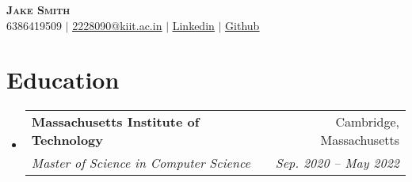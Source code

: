 \documentclass[letterpaper,11pt]{article}
\makeatletter
\newcommand{\resumeSubheading}[4]{
    \vspace{-2pt}\item
      \begin{tabular*}{0.97\textwidth}[t]{l@{\extracolsep{\fill}}r}
        \textbf{#1} & #2 \\
        \textit{\small#3} & \textit{\small #4} \\
      \end{tabular*}\vspace{-7pt}
  }
\newcommand{\resumeSubHeadingListStart}{\begin{itemize}[leftmargin=0.15in, label={}]}
\newcommand{\resumeSubHeadingListEnd}{\end{itemize}}
\makeatother
\begin{document}
  
  
  \begin{center}
      \textbf{\Huge \scshape Jake Smith} \\ \vspace{1pt}
      \small 6386419509 $|$ \href{2228090@kiit.ac.in}{\underline{2228090@kiit.ac.in}} $|$ 
      \href{https://linkedin.com/in/...}{\underline{Linkedin}} $|$
      \href{https://github.com/...}{\underline{Github}}
  \end{center}
  
  
  \section{Education}
    \resumeSubHeadingListStart
     \resumeSubheading
      {Massachusetts Institute of Technology}{Cambridge, Massachusetts}
      {Master of Science in Computer Science}{Sep. 2020 -- May 2022}
  
    \resumeSubHeadingListEnd
  
  
\end{document}

